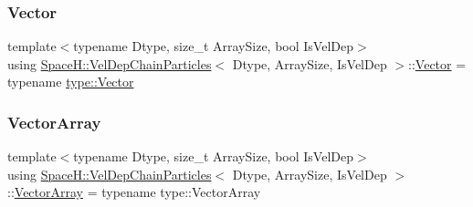 \mbox{\label{class_space_h_1_1_vel_dep_chain_particles_a954578905c7d7d1830c8e6eb95bc7eb6}} 
\subsubsection{\texorpdfstring{Vector}{Vector}\hspace{0.1cm}{\footnotesize\ttfamily [2/2]}}
{\footnotesize\ttfamily template$<$typename Dtype, size\+\_\+t Array\+Size, bool Is\+Vel\+Dep$>$ \\
using \mbox{\hyperlink{class_space_h_1_1_vel_dep_chain_particles}{Space\+H\+::\+Vel\+Dep\+Chain\+Particles}}$<$ Dtype, Array\+Size, Is\+Vel\+Dep $>$\+::\mbox{\hyperlink{class_space_h_1_1_vel_indep_particles_a61bbcfdb0dc7f99f3c68af69a755c935}{Vector}} =  typename \mbox{\hyperlink{struct_space_h_1_1_proto_type_a316b81f4660b2b4fab14a8e1f23b6089}{type\+::\+Vector}}}

\mbox{\label{class_space_h_1_1_vel_dep_chain_particles_ab2a1081b63c60af35e99d3d2250fb8ee}} 
\subsubsection{\texorpdfstring{Vector\+Array}{VectorArray}\hspace{0.1cm}{\footnotesize\ttfamily [1/2]}}
{\footnotesize\ttfamily template$<$typename Dtype, size\+\_\+t Array\+Size, bool Is\+Vel\+Dep$>$ \\
using \mbox{\hyperlink{class_space_h_1_1_vel_dep_chain_particles}{Space\+H\+::\+Vel\+Dep\+Chain\+Particles}}$<$ Dtype, Array\+Size, Is\+Vel\+Dep $>$\+::\mbox{\hyperlink{class_space_h_1_1_vel_indep_particles_aa9983058940249df8b00fa800e8cbad2}{Vector\+Array}} =  typename type\+::\+Vector\+Array}

\mbox{\label{class_space_h_1_1_vel_dep_chain_particles_ab2a1081b63c60af35e99d3d2250fb8ee}} 
